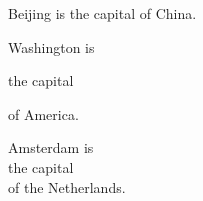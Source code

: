 \documentclass{article}
\begin{document}
Beijing is
the capital
of China.

Washington is %

the capital

of America.

Amsterdam is \\ the capital \\
of the Netherlands.
\end{document}
